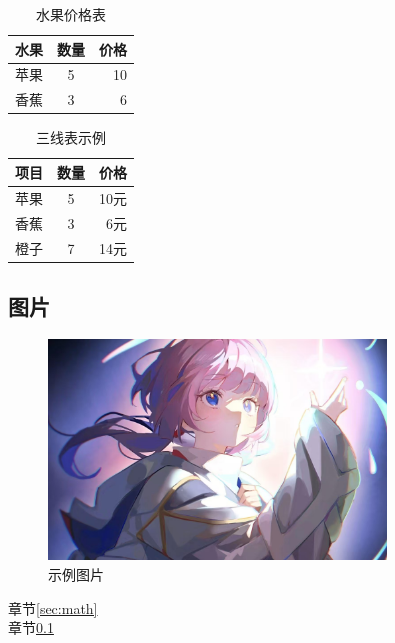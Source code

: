 \documentclass{article}
\begin{document}
\vspace{1cm}   %

\begin{table}[h]
\centering
\caption{水果价格表}
\label{tab:price}
\begin{tabular}{|l|c|r|}
\hline
水果&数量&价格 \\
\hline
苹果&5&10 \\
\hline
香蕉&3&6 \\
\hline
\end{tabular}
\end{table}

\vspace{1cm}   %

\begin{table}[htbp]
\centering
\caption{三线表示例}
\label{tab:example}
\begin{tabular}{lcr}  %
\toprule   %
项目&数量&价格 \\
\midrule   %
苹果&5&10元 \\
香蕉&3&6元 \\
橙子&7&14元 \\
\bottomrule %
\end{tabular}
\end{table}

\subsection{图片} \label{sec:figure}
\begin{figure}[htbp]
\centering
\includegraphics[width=0.8\textwidth]{kaf.jpg}
\caption{示例图片}
\label{fig:flowchart}
\end{figure}

章节\ref{sec:math} \\
章节\ref{sec:figure} \\
\end{document}
